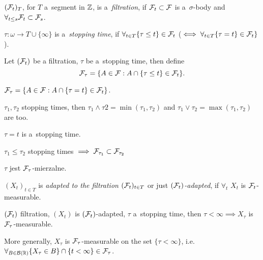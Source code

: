 



	\begin{definition}[filtration]
		$(\mathcal{F}_t)_T$, for $T$ a~segment in ${\mathbb{Z}}$, is a~\emph{filtration},
		if $\mathcal{F}_t \subset \mathcal{F}$ is a~$\sigma$-body and $\forall_{t \leq s} \mathcal{F}_t \subset \mathcal{F}_s$.
	\end{definition}
	
	\begin{definition}
		$\tau: \omega \to T \cup \{\infty\}$ is a~\emph{stopping time}, if
		$\forall_{t \in T} \{\tau \leq t\} \in \mathcal{F}_t$
		($\iff \forall_{t \in T} \{ \tau = t\} \in \mathcal{F}_t\}$).
	\end{definition}
	
	\begin{definition}
		Let $(\mathcal{F}_t)$ be a filtration, $\tau$ be a~stopping time, then define
		$$\mathcal{F}_\tau = \{ A \in \mathcal{F}: A \cap \{ \tau \leq t\} \in \mathcal{F}_t\}.$$
	\end{definition}
	
	\begin{proposition}
		$\mathcal{F}_\tau = \{ A \in \mathcal{F}: A \cap \{ \tau = t \} \in \mathcal{F}_t\}$.
	\end{proposition}
	
	\begin{proposition}
		$\tau_1, \tau_2$ stopping times, then $\tau_1 \wedge \tau2 = \min(\tau_1, \tau_2)$
		and $\tau_1 \vee \tau_2 = \max(\tau_1, \tau_2)$ are too.
		
		$\tau = t$ is a~stopping time.
		
		$\tau_1 \leq \tau_2$ stopping times $\implies \mathcal{F}_{\tau_1} \subset \mathcal{F}_{\tau_2}$
		
		$\tau$ jest $\mathcal{F}_\tau$-mierzalne.
	\end{proposition}
	
	\begin{definition}
		$(X_t)_{t \in T}$ is \emph{adapted to the filtration} $(\mathcal{F}_t)_{t \in T}$ or just \emph{$(\mathcal{F}_t)$-adapted}, if $\forall_t$ $X_t$ is $\mathcal{F}_t$-measurable.
	\end{definition}
	
	\begin{proposition}
		$(\mathcal{F}_t)$ filtration, $(X_t)$ is $(\mathcal{F}_t)$-adapted, $\tau$ a~stopping time,
		then $\tau < \infty \implies X_\tau$ is $\mathcal{F}_\tau$-measurable.
		
		More generally, $X_\tau$ is $\mathcal{F}_\tau$-measurable on the set $\{\tau < \infty\}$,
		i.e. $\forall_{B \in \mathcal{B}(\mathbb{R})} \{X_\tau \in B\} \cap \{t < \infty\} \in \mathcal{F}_\tau$.
	\end{proposition}
	
